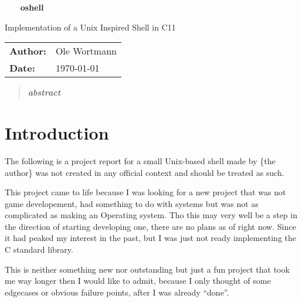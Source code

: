 \documentclass[12pt,english]{article}
\begin{document}
\begin{titlepage}
\begin{center}
    \vfill
	
	{\sffamily\fontsize{16mm}{18mm}\selectfont\bfseries
    oshell}\\
	\vspace{12mm}

	{\sffamily\large Implementation of a Unix Inspired Shell in C11}\\

	\vspace{60mm}

	\begin{tabular}{ll}
	\textbf{Author:} & Ole Wortmann \\[5mm]
	\textbf{Date:} & \today \\[5mm]
	\end{tabular}

	\vfill

\end{center}
\end{titlepage}

\newpage
\begin{abstract}
  \textit{
\textbf{abstract}
  }
\end{abstract}
\newpage

\tableofcontents

\newpage
{}
\section{Introduction}
The following is a project report for a small Unix-based
shell made by \{the author\} was not created in any official
context and should be treated as such.

This project came to life because I was looking for a
new project that was not game developement, had something to
do with systems but was not as complicated as making an
Operating system.
Tho this may very well be a step in the
direction of starting developing one, there are no plans as
of right now.
Since it had peaked
my interest in the past, but I was just not ready implementing
the C standard library.

This is neither something new
nor outstanding but just a fun project that took me way
longer then I would like to admit, because I only thought
of some edgecases or obvious failure points, after I was
already ``done''.
\end{document}
